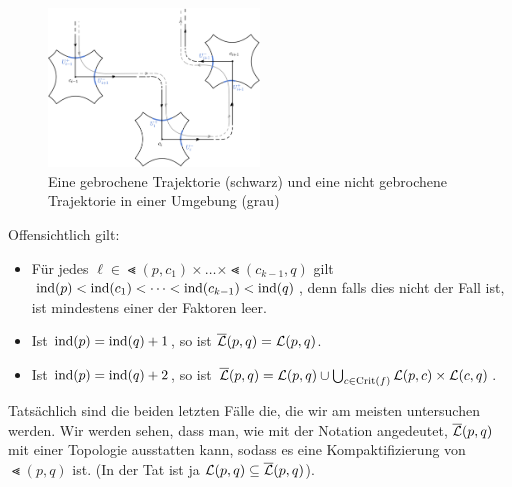 \begin{figure}[H]
    \centering
    \includegraphics[width=0.5\textwidth]{../resources/broken-trajectories.png}
    \caption{Eine gebrochene Trajektorie (schwarz) und eine nicht gebrochene Trajektorie 
    in einer Umgebung (grau)}
    \label{fig: gebrochene trajektorien}
\end{figure}


Offensichtlich gilt:
\begin{itemize}
    \item Für jedes $\ell \in \Lt (p, c_1) \times \dots \times \Lt (c_{k - 1}, q)$ gilt 
        ${ \operatorname{ind} } (p) < { \operatorname{ind} } (c_1) < \dots < { \operatorname{ind} } (c_{k - 1}) < { \operatorname{ind} } (q)$, denn falls dies nicht
        der Fall ist, ist mindestens einer der Faktoren leer. 
    \item Ist ${ \operatorname{ind} } (p) = { \operatorname{ind} } (q) + 1$, so ist ${\overline{\mathcal{L}} } (p, q) = { \mathcal{L} } (p, q)$.
    \item Ist ${ \operatorname{ind} } (p) = { \operatorname{ind} } (q) + 2$, so ist 
        ${\overline{\mathcal{L}} } (p, q) = { \mathcal{L} } (p, q) \cup \bigcup_{c \in { \operatorname{Crit} } (f)} { \mathcal{L} }(p, c) \times { \mathcal{L} }(c, q)$.
\end{itemize}
Tatsächlich sind die beiden letzten Fälle die, die wir am meisten untersuchen werden.
Wir werden sehen, dass man, wie mit der Notation angedeutet, ${\overline{\mathcal{L}} } (p, q)$ mit einer Topologie 
ausstatten kann, sodass es eine Kompaktifizierung von $\Lt (p, q)$ ist. (In der Tat ist ja 
${ \mathcal{L} } (p, q) \subseteq {\overline{\mathcal{L}} } (p, q)$).

